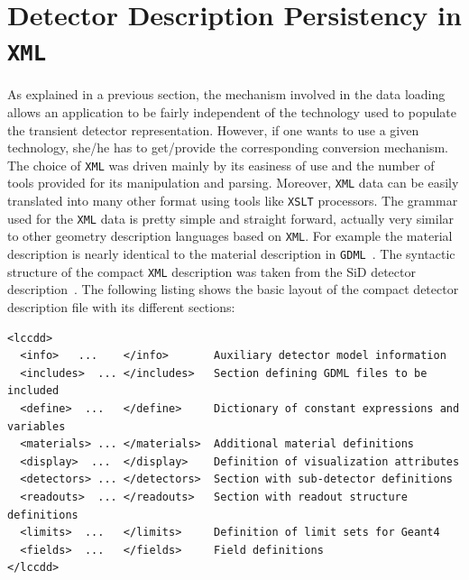 \section{Detector Description Persistency in \texttt{XML}}
\label{sec:compact-xml-structure}
As explained in a previous section, the mechanism involved in the data loading allows an application to be fairly independent of the technology used to populate the transient detector representation. However, if one wants to use a given technology, she/he has to get/provide the corresponding conversion mechanism. The choice of \texttt{XML} was driven mainly by its easiness of use and the number of tools provided for its manipulation and parsing. Moreover, \texttt{XML} data can be easily translated into many other format using tools like \texttt{XSLT}  processors. The grammar used for the \texttt{XML} data is pretty simple and straight forward, actually very similar to other geometry description languages based on \texttt{XML}. For example the material description is nearly identical to the material description in \texttt{GDML}~\cite{Chytracek:2006be}. The syntactic structure of the compact \texttt{XML} description was taken from the SiD detector description~\cite{Gaede:81331}. The following listing shows the basic layout of the compact detector description file with its different sections:

\begin{verbatim}
<lccdd>
  <info>   ...    </info>       Auxiliary detector model information
  <includes>  ... </includes>   Section defining GDML files to be included
  <define>  ...   </define>     Dictionary of constant expressions and variables
  <materials> ... </materials>  Additional material definitions
  <display>  ...  </display>    Definition of visualization attributes
  <detectors> ... </detectors>  Section with sub-detector definitions
  <readouts>  ... </readouts>   Section with readout structure definitions
  <limits>  ...   </limits>     Definition of limit sets for Geant4
  <fields>  ...   </fields>     Field definitions
</lccdd>
\end{verbatim}

